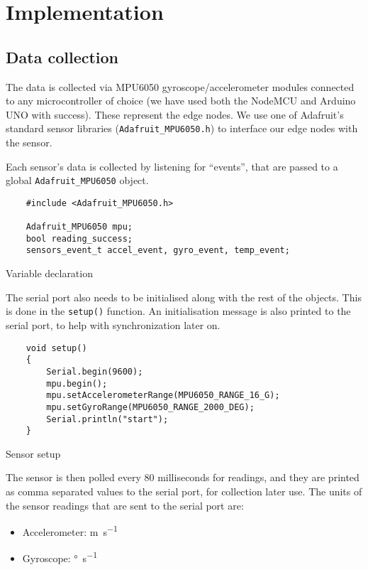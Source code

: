 \documentclass[./main.tex]{subfiles}
\begin{document}
\chapter{Implementation}
\section{Data collection}
The data is collected via MPU6050 gyroscope/accelerometer modules connected to
any microcontroller of choice (we have used both the NodeMCU and Arduino UNO
with success). These represent the edge nodes. We use one of Adafruit's
standard sensor libraries (\texttt{Adafruit_MPU6050.h}) to interface
our edge nodes with the sensor.
\par

Each sensor's data is collected by listening for ``events'', that are passed to
a global \texttt{Adafruit_MPU6050} object.

\begin{code}
    \begin{verbatim}
    #include <Adafruit_MPU6050.h>

    Adafruit_MPU6050 mpu;
    bool reading_success;
    sensors_event_t accel_event, gyro_event, temp_event;
    \end{verbatim}
    \caption{Variable declaration}
    \label{code:ucvarinit}
\end{code}
\vspace{0.5cm}

The serial port also needs to be initialised along with the rest of the
objects. This is done in the \texttt{setup()} function. An
initialisation message is also printed to the serial port, to help with
synchronization later on.

\begin{code}
    \begin{verbatim}
    void setup()
    {
        Serial.begin(9600);
        mpu.begin();
        mpu.setAccelerometerRange(MPU6050_RANGE_16_G);
        mpu.setGyroRange(MPU6050_RANGE_2000_DEG);
        Serial.println("start");
    }
    \end{verbatim}
    \caption{Sensor setup}
    \label{code:ucsetup}
\end{code}
\vspace{0.5cm}

The sensor is then polled every 80 milliseconds for readings, and they are
printed as comma separated values to the serial port, for collection later use.
The units of the sensor readings that are sent to the serial port are:
\begin{itemize}
    \item Accelerometer: \unit{\metre\per\second}
    \item Gyroscope: \unit{\degree\per\second}
\end{itemize}
\end{document}
